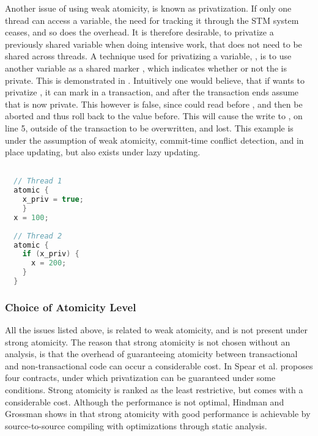 Another issue of using weak atomicity, is known as privatization. If only one thread can access a variable, the need for tracking it through the \ac{STM} system ceases, and so does the overhead. It is therefore desirable, to privatize a previously shared variable when doing intensive work, that does not need to be shared across threads. A technique used for privatizing a variable, , is to use another variable as a shared marker , which indicates whether or not the  is private. This is demonstrated in . Intuitively one would believe, that if  wants to privatize , it can mark  in a transaction, and after the transaction ends assume that  is now private. This however is false, since  could read  before , and then be aborted and thus roll  back to the value before. This will cause the write to , on line 5, outside of the transaction to be overwritten, and lost. This example is under the assumption of weak atomicity, commit-time conflict detection, and in place updating, but also exists under lazy updating\cite[p. 34]{harris2010transactional}. 

\begin{lstlisting}[label=lst:privatization,
  caption={Privatization issue},
  language=Java,  
  showspaces=false,
  showtabs=false,
  breaklines=true,
  showstringspaces=false,
  breakatwhitespace=true,
  commentstyle=\color{greencomments},
  keywordstyle=\color{bluekeywords},
  stringstyle=\color{redstrings},
  morekeywords={atomic, retry, orElse, var, get, set}]  % Start your code-block

  // Thread 1
  atomic {
    x_priv = true;
    }
  x = 100;
  
  // Thread 2
  atomic {
    if (x_priv) {
      x = 200;
    }
  }
\end{lstlisting}


\subsubsection{Choice of Atomicity Level}
All the issues listed above, is related to weak atomicity, and is not present under strong atomicity. The reason that strong atomicity is not chosen without an analysis, is that the overhead of guaranteeing atomicity between transactional and non-transactional code can occur a considerable cost\cite{spear2007privatization}. In \cite{spear2007privatization} Spear et al. proposes four contracts, under which privatization can be guaranteed under some conditions. Strong atomicity is ranked as the least restrictive, but comes with a considerable cost. Although the performance is not optimal, Hindman and Grossman shows in \cite{hindman2006atomicity} that strong atomicity with good performance is achievable by source-to-source compiling with optimizations through static analysis.

